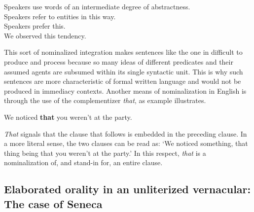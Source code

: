 \ea%
    \label{ex:6:6}
Speakers use words of an intermediate degree of abstractness.\\
Speakers refer to entities in this way.\\
Speakers prefer this.\\
We observed this tendency.
    \z

\noindent This sort of nominalized integration makes sentences like the one in  difficult to produce and process because so many ideas of different predicates and their assumed agents are subsumed within its single syntactic unit. This is why such sentences are more characteristic of formal written language and would not be produced in immediacy contexts. Another means of nominalization in English is through the use of the complementizer \textit{that}, as example  illustrates.

\ea%
    \label{ex:6:7}
         We noticed \textbf{that} you weren’t at the party.
    \z

\noindent \textit{That} signals that the clause that follows is embedded in the preceding clause. In a more literal sense, the two clauses can be read as: ‘We noticed something, that thing being that you weren’t at the party.’ In this respect, \textit{that} is a nominalization of, and stand-in for, an entire clause.

\subsection{Elaborated orality in an unliterized vernacular: The case of Seneca}\label{sec:6.1.3}

